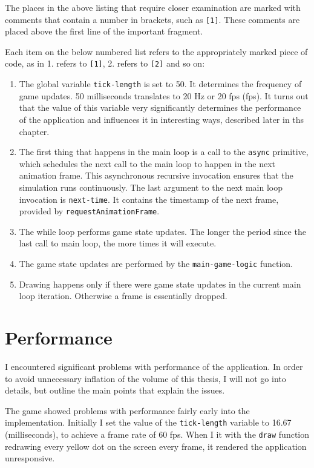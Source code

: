 The places in the above listing that require closer examination are marked with comments that contain a number in brackets, such as \texttt{[1]}. These comments are placed above the first line of the important fragment.

Each item on the below numbered list refers to the appropriately marked piece of code, as in 1. refers to \texttt{[1]}, 2. refers to \texttt{[2]} and so on:
\begin{enumerate}
\item The global variable \texttt{tick-length} is set to 50. It determines the frequency of game updates. 50 milliseconds translates to 20 Hz or 20 \acrshort{fps} (\acrlong{fps}). It turns out that the value of this variable very significantly determines the performance of the application and influences it in interesting ways, described later in ths chapter.

\item The first thing that happens in the main loop is a call to the \texttt{async} primitive, which schedules the next call to the main loop to happen in the next animation frame. This asynchronous recursive invocation ensures that the simulation runs continuously. The last argument to the next main loop invocation is \texttt{next-time}. It contains the timestamp of the next frame, provided by \texttt{requestAnimationFrame}.

\item The while loop performs game state updates. The longer the period since the last call to main loop, the more times it will execute.
\item The game state updates are performed by the \texttt{main-game-logic} function.
\item Drawing happens only if there were game state updates in the current main loop iteration. Otherwise a frame is essentially dropped.
\end{enumerate}

\section{Performance}
I encountered significant problems with performance of the application. In order to avoid unnecessary inflation of the volume of this thesis, I will not go into details, but outline the main points that explain the issues.

The game showed problems with performance fairly early into the implementation. Initially I set the value of the \texttt{tick-length} variable to 16.67 (milliseconds), to achieve a frame rate of 60 \acrshort{fps}. When I it with the \texttt{draw} function redrawing every yellow dot on the screen every frame, it rendered the application unresponsive.

